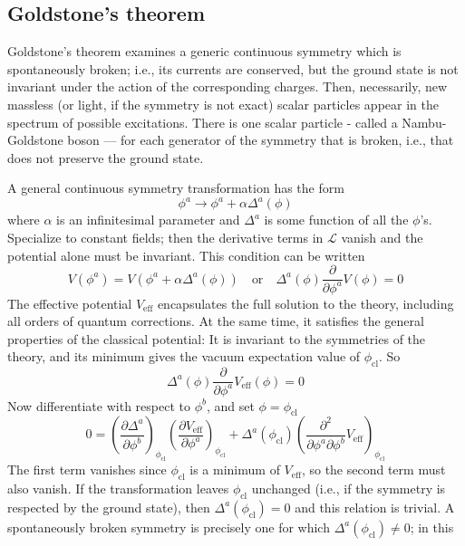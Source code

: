 \subsection{Goldstone's theorem}
\begin{newthem}
Goldstone's theorem examines a generic continuous symmetry which is spontaneously broken; i.e., its currents are conserved, but the ground state is not invariant under the action of the corresponding charges. Then, necessarily, new massless (or light, if the symmetry is not exact) scalar particles appear in the spectrum of possible excitations. There is one scalar particle - called a Nambu-Goldstone boson — for each generator of the symmetry that is broken, i.e., that does not preserve the ground state.
\end{newthem}
\begin{newproof}
A general continuous symmetry transformation has the form
\[\phi^a \to \phi^a + \alpha \Delta^a (\phi)\]
where $\alpha$ is an infinitesimal parameter and $\Delta^a$ is some function of all the $\phi$'s. Specialize to constant fields; then the derivative terms in $\mathcal{L}$ vanish and the potential alone must be invariant. This condition can be written
\[V(\phi^a) = V(\phi^a + \alpha \Delta^a (\phi)) \quad \mbox{or} \quad \Delta^a(\phi) \frac{\partial}{\partial \phi^a} V(\phi) = 0\]
The effective potential $V_{\mathrm{eff}}$ encapsulates the full solution to the theory, including all orders of quantum corrections. At the same time, it satisfies the general properties of the classical potential: It is invariant to the symmetries of the theory, and its minimum gives the vacuum expectation value of $\phi_{\mathrm{cl}}$. So
\[\Delta^a(\phi) \frac{\partial}{\partial \phi^a} V_{\mathrm{eff}}(\phi) = 0\]
Now differentiate with respect to $\phi^b$, and set $\phi = \phi_{\mathrm{cl}}$
\[0 = \left( \frac{\partial \Delta^a}{\partial \phi^b} \right)_{\phi_{\mathrm{cl}}} \left( \frac{\partial V_{\mathrm{eff}}}{\partial \phi^a}\right)_{\phi_{\mathrm{cl}}} + \Delta^a(\phi_{\mathrm{cl}}) \left( \frac{\partial^2}{\partial \phi^a \partial \phi^b}V_{\mathrm{eff}}\right)_{\phi_{\mathrm{cl}}}\]
The first term vanishes since $\phi_{\mathrm{cl}}$ is a minimum of $V_{\mathrm{eff}}$, so the second term must also vanish. If the transformation leaves $\phi_{\mathrm{cl}}$ unchanged (i.e., if the symmetry is respected by the ground state), then $\Delta^a(\phi_{\mathrm{cl}})=0$ and this relation is trivial. A spontaneously broken symmetry is precisely one for which $\Delta^a(\phi_{\mathrm{cl}}) \neq 0$; in this

\end{newproof}
